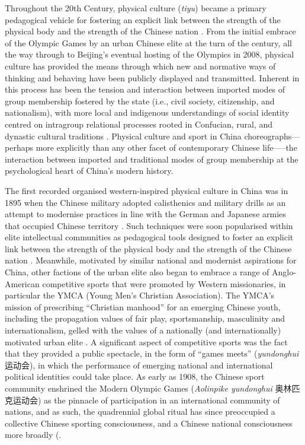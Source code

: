     Throughout the 20th Century, physical culture (\textit{tiyu}) became a primary pedagogical vehicle for fostering an explicit link between the strength of the physical body and the strength of the Chinese nation \cites[32]{Morris2004}[49]{Brownell1995}.  From the initial embrace of the Olympic Games by an urban Chinese elite at the turn of the century, all the way through to Beijing's eventual hosting of the Olympics in 2008, physical culture has provided the means through which new and normative ways of thinking and behaving have been publicly displayed and transmitted.  Inherent in this process has been the tension and interaction between imported modes of group membership fostered by the state (i.e., civil society, citizenship, and nationalism), with more local and indigenous understandings of social identity centred on intragroup relational processes rooted in Confucian, rural, and dynastic cultural traditions \citep{Fei1992}.  Physical culture and sport in China choreographs---perhaps more explicitly than any other facet of contemporary Chinese life—--the interaction between imported and traditional modes of group membership at the psychological heart of China's modern history.

    The first recorded organised western-inspired physical culture in China was in 1895 when the Chinese military adopted calisthenics and military drills as an attempt to modernise practices in line with the German and Japanese armies that occupied Chinese territory \citep[viii]{Knuttgen1990}. Such techniques were soon popularised within elite intellectual communities as pedagogical tools designed to foster an explicit link between the strength of the physical body and the strength of the Chinese nation \cites[32]{Morris2004}[49]{Brownell1995}.  Meanwhile, motivated by similar national and modernist aspirations for China, other factions of the urban elite also began to embrace a range of Anglo-American competitive sports that were promoted by Western missionaries, in particular the YMCA (Young Men’s Christian Association).  The YMCA’s mission of prescribing ``Christian manhood'' for an emerging Chinese youth, including the propagation values of fair play, sportsmanship, masculinity and internationalism, gelled with the values of a nationally (and internationally) motivated urban elite \citep[240]{Morris2004}.  A significant aspect of competitive sports was the fact that they provided a public spectacle, in the form of “games meets” (\textit{yundonghui} 运动会), in which the performance of emerging national and international political identities could take place.  As early as 1908, the Chinese sport community enshrined the Modern Olympic Games (\textit{Aolinpike yundonghui} 奥林匹克运动会) as the pinnacle of participation in an international community of nations, and as such, the quadrennial global ritual has since preoccupied a collective Chinese sporting consciousness, and a Chinese national consciousness more broadly (\citep{Burnett2009;Barme2009;Brownell2008;Morris2004;Xu2008}.

